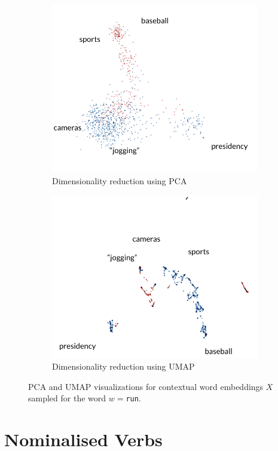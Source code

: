 \documentclass[a4paper,12pt,oneside,openright]{report}
\begin{document}
\begin{figure}[H]
\begin{subfigure}{.45\textwidth}
  \centering
  \includegraphics[width=.8\linewidth]{./assets/analysis/run_pca.png}
  \caption{Dimensionality reduction using PCA}
  \label{fig:sfig1}
\end{subfigure}%
\hfill
\begin{subfigure}{.45\textwidth}
  \centering
  \includegraphics[width=.8\linewidth]{./assets/analysis/run_umap.png}
  \caption{Dimensionality reduction using UMAP}
  \label{fig:sfig2}
\end{subfigure}
\caption{PCA and UMAP visualizations for contextual word embeddings $X$ sampled for the word $w=$\texttt{run}. }
\label{fig:run_tensorboard}
\end{figure}


\section{Nominalised Verbs}\label{section:frozen_verbs}
\end{document}
